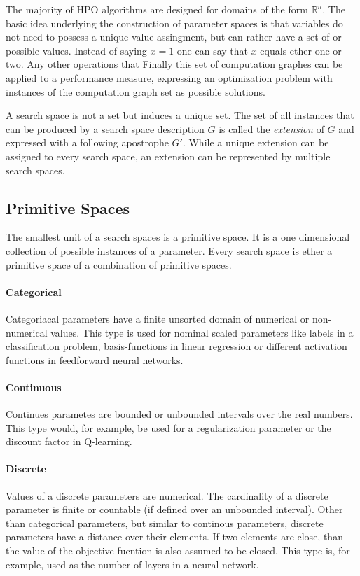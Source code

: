 \documentclass[english]{article}
\begin{document}
The majority of \ac{HPO} algorithms are designed for domains of the form $\mathbb{R}^n$.
The basic idea underlying the construction of parameter spaces is that variables do not need to possess a unique value assingment, but can rather have a set of or possible values. Instead of saying $x = 1$ one can say that $x$ equals ether one or two. Any other operations that Finally this set of computation graphes can be applied to a performance measure, expressing an optimization problem with instances of the computation graph set as possible solutions.

A search space is not a set but induces a unique set. The set of all instances that can be produced by a search space description $G$ is called the \textit{extension} of $G$ and expressed with a following apostrophe $G'$. While a unique extension can be assigned to every search space, an extension can be represented by multiple search spaces.

\subsection{Primitive Spaces}
The smallest unit of a search spaces is a primitive space. It is a one dimensional collection of possible instances of a parameter. Every search space is ether a primitive space of a combination of primitive spaces.

\paragraph{Categorical}
Categoriacal parameters have a finite unsorted domain of numerical or non-numerical values. This type is used for nominal scaled parameters like labels in a classification problem, basis-functions in linear regression or different activation functions in feedforward neural networks.

\paragraph{Continuous}
Continues parametes are bounded or unbounded intervals over the real numbers. This type would, for example, be used for a regularization parameter or the discount factor in Q-learning.

\paragraph{Discrete}
Values of a discrete parameters are numerical. The cardinality of a discrete parameter is finite or countable (if defined over an unbounded interval).
Other than categorical parameters, but similar to continous parameters, discrete parameters have a distance over their elements. If two elements are close, than the value of the objective fucntion is also assumed to be closed. This type is, for example, used as the number of layers in a neural network.
\end{document}
